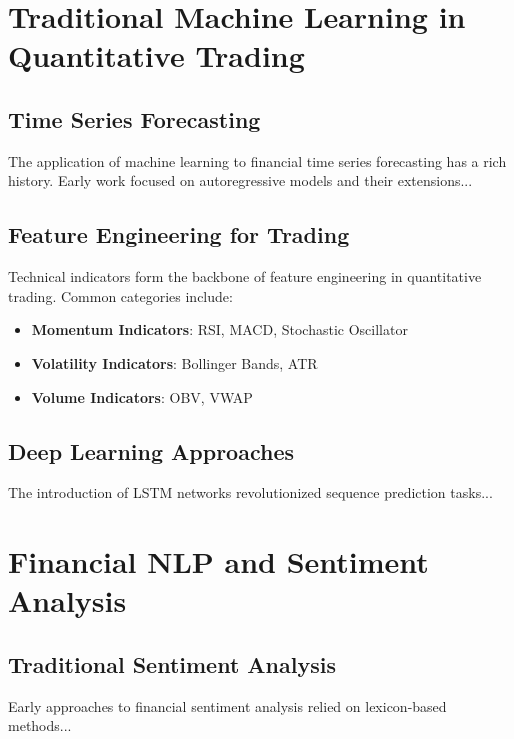 
\section{Traditional Machine Learning in Quantitative Trading}

\subsection{Time Series Forecasting}

The application of machine learning to financial time series forecasting has a rich history. Early work focused on autoregressive models and their extensions...

\subsection{Feature Engineering for Trading}

Technical indicators form the backbone of feature engineering in quantitative trading. Common categories include:

\begin{itemize}
    \item \textbf{Momentum Indicators}: RSI, MACD, Stochastic Oscillator
    \item \textbf{Volatility Indicators}: Bollinger Bands, ATR
    \item \textbf{Volume Indicators}: OBV, VWAP
\end{itemize}

\subsection{Deep Learning Approaches}

The introduction of LSTM networks \cite{hochreiter1997lstm} revolutionized sequence prediction tasks...

\section{Financial NLP and Sentiment Analysis}

\subsection{Traditional Sentiment Analysis}

Early approaches to financial sentiment analysis relied on lexicon-based methods...

